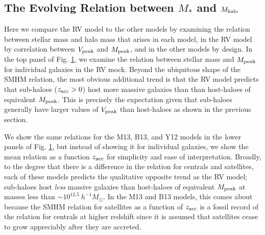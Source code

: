 \documentclass[a4paper,fleqn,usenatbib]{mnras}
\begin{document}
\begin{figure}
    \label{fig:SMHM_comparison}
\end{figure}


\subsection{The Evolving Relation between $M_*$ and $M_{\rm halo}$}
\label{sec:rv_sm_evolv}

Here we compare the RV model to the other models by examining the relation between stellar mass and halo mass that arises in each model, in the RV model by correlation between $V_{\rm peak}$ and $M_{\rm peak}$, and in the other models by design.  In the top panel of Fig. \ref{fig:SMHM_comparison}, we examine the relation between stellar mass and $M_{\rm peak}$ for individual galaxies in the RV mock.  Beyond the ubiquitous shape of the SMHM relation, the most obvious additional trend is that the RV model predicts that sub-haloes ($z_{\rm acc}>0$) host more massive galaxies than than host-haloes of equivalent $M_{\rm peak}$.  This is precisely the expectation given that sub-haloes generally have larger values of $V_{\rm peak}$ than host-haloes as shown in the previous section.

We show the same relations for the M13, B13, and Y12 models in the lower panels of Fig. \ref{fig:SMHM_comparison}, but instead of showing it for individual galaxies, we show the mean relation as a function $z_{\rm acc}$ for simplicity and ease of interpretation.  Broadly, to the degree that there is a difference in the relation for centrals and satellites, each of these models predicts the qualitative opposite trend as the RV model; sub-haloes host {\em less} massive galaxies than host-haloes of equivalent $M_{\rm peak}$ at masses less than $\sim 10^{12.5} ~ h^{-1} M_{\odot}$.  In the M13 and B13 models, this comes about because the SMHM relation for satellites as a function of $z_{\rm acc}$ is a fossil record of the relation for centrals at higher redshift since it is assumed that satellites cease to grow appreciably after they are accreted.  
\end{document}
